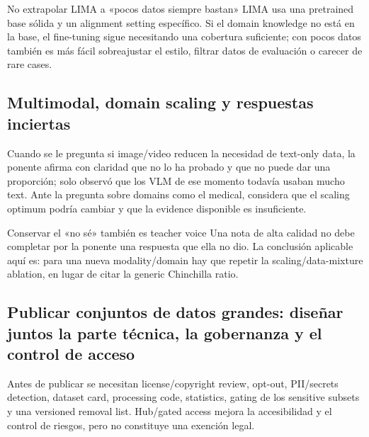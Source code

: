 \documentclass[a4paper]{article}
\begin{document}
\begin{warningbox}{No extrapolar LIMA a «pocos datos siempre bastan»}
LIMA usa una pretrained base sólida y un alignment setting específico. Si el domain knowledge no está en la base, el fine-tuning sigue necesitando una cobertura suficiente; con pocos datos también es más fácil sobreajustar el estilo, filtrar datos de evaluación o carecer de rare cases.
\end{warningbox}


\subsection{Multimodal, domain scaling y respuestas inciertas}

Cuando se le pregunta si image/video reducen la necesidad de text-only data, la ponente afirma con claridad que no lo ha probado y que no puede dar una proporción; solo observó que los VLM de ese momento todavía usaban mucho text. Ante la pregunta sobre domains como el medical, considera que el scaling optimum podría cambiar y que la evidence disponible es insuficiente.

\begin{importantbox}{Conservar el «no sé» también es teacher voice}
Una nota de alta calidad no debe completar por la ponente una respuesta que ella no dio. La conclusión aplicable aquí es: para una nueva modality/domain hay que repetir la scaling/data-mixture ablation, en lugar de citar la generic Chinchilla ratio.
\end{importantbox}


\subsection{Publicar conjuntos de datos grandes: diseñar juntos la parte técnica, la gobernanza y el control de acceso}

Antes de publicar se necesitan license/copyright review, opt-out, PII/secrets detection, dataset card, processing code, statistics, gating de los sensitive subsets y una versioned removal list. Hub/gated access mejora la accesibilidad y el control de riesgos, pero no constituye una exención legal.
\end{document}
